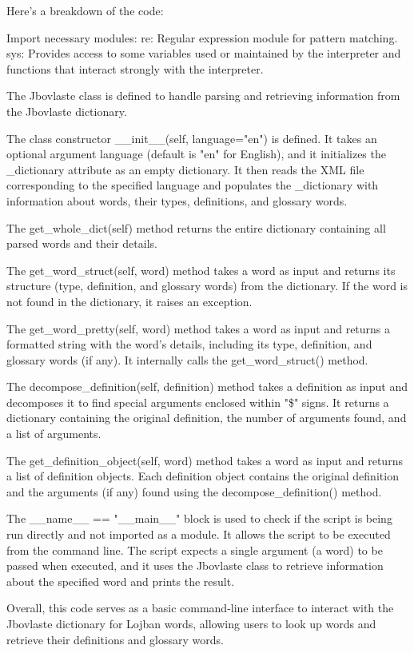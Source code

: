 Here's a breakdown of the code:

    Import necessary modules:
        re: Regular expression module for pattern matching.
        sys: Provides access to some variables used or maintained by the interpreter and functions that interact strongly with the interpreter.

    The Jbovlaste class is defined to handle parsing and retrieving information from the Jbovlaste dictionary.

    The class constructor \_\_init\_\_(self, language="en") is defined. It takes an optional argument language (default is "en" for English), and it initializes the \_dictionary attribute as an empty dictionary. It then reads the XML file corresponding to the specified language and populates the \_dictionary with information about words, their types, definitions, and glossary words.

    The get\_whole\_dict(self) method returns the entire dictionary containing all parsed words and their details.

    The get\_word\_struct(self, word) method takes a word as input and returns its structure (type, definition, and glossary words) from the dictionary. If the word is not found in the dictionary, it raises an exception.

    The get\_word\_pretty(self, word) method takes a word as input and returns a formatted string with the word's details, including its type, definition, and glossary words (if any). It internally calls the get\_word\_struct() method.

    The decompose\_definition(self, definition) method takes a definition as input and decomposes it to find special arguments enclosed within "\$" signs. It returns a dictionary containing the original definition, the number of arguments found, and a list of arguments.

    The get\_definition\_object(self, word) method takes a word as input and returns a list of definition objects. Each definition object contains the original definition and the arguments (if any) found using the decompose\_definition() method.

    The \_\_name\_\_ == "\_\_main\_\_" block is used to check if the script is being run directly and not imported as a module. It allows the script to be executed from the command line. The script expects a single argument (a word) to be passed when executed, and it uses the Jbovlaste class to retrieve information about the specified word and prints the result.

Overall, this code serves as a basic command-line interface to interact with the Jbovlaste dictionary for Lojban words, allowing users to look up words and retrieve their definitions and glossary words.